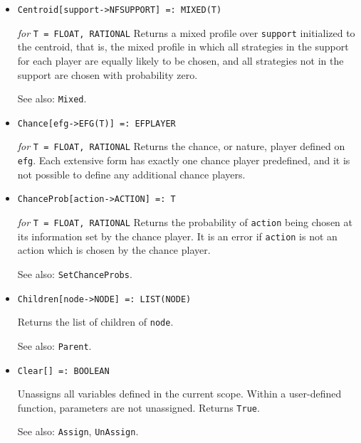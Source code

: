 \begin{itemize}
\item
\protect \large \begin{verbatim}
Centroid[support->NFSUPPORT] =: MIXED(T)
\end{verbatim}\normalsize

{\it for} {\tt T = FLOAT, RATIONAL}
\bd
Returns a mixed profile over \verb+support+
initialized to the centroid, that is, the mixed profile in which 
all strategies in the support for each player are equally likely to be
chosen, and all strategies not in the support are chosen with probability
zero.
\item [See also:] \verb+Mixed+.
\ed

\item
\protect \large \begin{verbatim}
Chance[efg->EFG(T)] =: EFPLAYER
\end{verbatim}\normalsize

{\it for} {\tt T = FLOAT, RATIONAL}
\bd
Returns the chance, or nature, player defined on \verb+efg+.
Each extensive form has exactly one
chance player predefined, and it is not possible to define any additional
chance players.
\ed

\item
\protect \large \begin{verbatim}
ChanceProb[action->ACTION] =: T
\end{verbatim}\normalsize

{\it for} {\tt T = FLOAT, RATIONAL}
\bd
Returns the probability of \verb+action+ being chosen at its information
set by the chance player.  It is an error if \verb+action+ is not an action
which is chosen by the chance player.
\item [See also:] \verb+SetChanceProbs+.
\ed

\item
\protect \large \begin{verbatim} 
Children[node->NODE] =: LIST(NODE)
\end{verbatim}\normalsize

\bd
Returns the list of children of \verb+node+.
\item [See also:] \verb+Parent+.
\ed

\item
\protect \large \begin{verbatim}
Clear[] =: BOOLEAN
\end{verbatim}\normalsize

\bd
Unassigns all variables defined in the current scope.  Within a user-defined
function, parameters are not unassigned.  Returns \verb+True+.
\item [See also:] \verb+Assign+, \verb+UnAssign+.
\ed


\end{itemize}
